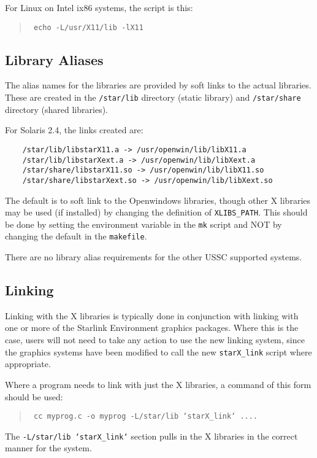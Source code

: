 For Linux on Intel ix86 systems, the script is this:

\begin{quote}{\tt
echo -L/usr/X11/lib -lX11}
\end{quote}

\subsection{Library Aliases}

The alias names for the libraries are provided by soft links to the 
actual libraries.  These are created in the {\tt /star/lib} directory
(static library) and {\tt /star/share} directory (shared libraries).

For Solaris 2.4, the links created are:

\begin{verbatim}
    /star/lib/libstarX11.a -> /usr/openwin/lib/libX11.a
    /star/lib/libstarXext.a -> /usr/openwin/lib/libXext.a
    /star/share/libstarX11.so -> /usr/openwin/lib/libX11.so
    /star/share/libstarXext.so -> /usr/openwin/lib/libXext.so
\end{verbatim}

The default is to soft link to the Openwindows libraries, though other X
libraries may be used (if installed) by changing the definition of 
{\tt XLIBS\_PATH}.  This should be done by setting the environment variable
in the {\tt mk} script and NOT by changing the default in the {\tt makefile}.

There are no library alias requirements for the other USSC supported systems.

\subsection{Linking}

Linking with the X libraries is typically done in conjunction with linking 
with one or more of the Starlink Environment graphics packages.  Where this
is the case, users will not need to take any action to use the new
linking system, since the graphics systems have been modified to call
the new {\tt starX\_link} script where appropriate.

Where a program needs to link with just the X libraries, a command of
this form should be used:

\begin{quote}{\tt
cc myprog.c -o myprog -L/star/lib `starX\_link` ....}
\end{quote}

The {\tt -L/star/lib `starX\_link`} section pulls in the X libraries in
the correct manner for the system.


